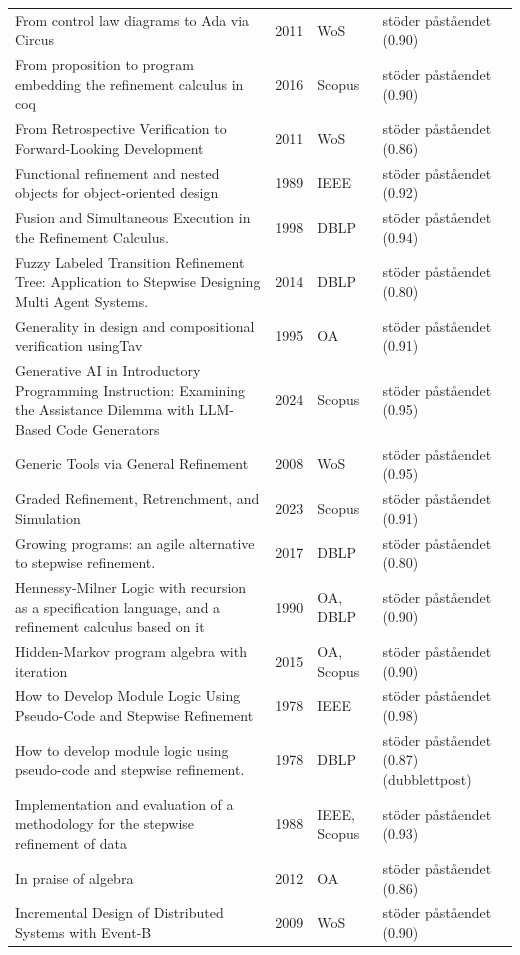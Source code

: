 \begin{longtable}{@{}%
  >{\raggedright\arraybackslash}p{}c%
  >{\raggedright\arraybackslash}p{}%
  >{\raggedright\arraybackslash}p{}@{}}
From control law diagrams to Ada via Circus & 2011 & WoS & stöder påståendet (0.90) \\
From proposition to program embedding the refinement calculus in coq & 2016 & Scopus & stöder påståendet (0.90) \\
From Retrospective Verification to Forward-Looking Development & 2011 & WoS & stöder påståendet (0.86) \\
Functional refinement and nested objects for object-oriented design & 1989 & IEEE & stöder påståendet (0.92) \\
Fusion and Simultaneous Execution in the Refinement Calculus. & 1998 & DBLP & stöder påståendet (0.94) \\
Fuzzy Labeled Transition Refinement Tree: Application to Stepwise Designing Multi Agent Systems. & 2014 & DBLP & stöder påståendet (0.80) \\
Generality in design and compositional verification usingTav & 1995 & OA & stöder påståendet (0.91) \\
Generative AI in Introductory Programming Instruction: Examining the Assistance Dilemma with LLM-Based Code Generators & 2024 & Scopus & stöder påståendet (0.95) \\
Generic Tools via General Refinement & 2008 & WoS & stöder påståendet (0.95) \\
Graded Refinement, Retrenchment, and Simulation & 2023 & Scopus & stöder påståendet (0.91) \\
Growing programs: an agile alternative to stepwise refinement. & 2017 & DBLP & stöder påståendet (0.80) \\
Hennessy-Milner Logic with recursion as a specification language, and a refinement calculus based on it & 1990 & OA, DBLP & stöder påståendet (0.90) \\
Hidden-Markov program algebra with iteration & 2015 & OA, Scopus & stöder påståendet (0.90) \\
How to Develop Module Logic Using Pseudo-Code and Stepwise Refinement & 1978 & IEEE & stöder påståendet (0.98) \\
How to develop module logic using pseudo-code and stepwise refinement. & 1978 & DBLP & stöder påståendet (0.87) (dubblettpost) \\
Implementation and evaluation of a methodology for the stepwise refinement of data & 1988 & IEEE, Scopus & stöder påståendet (0.93) \\
In praise of algebra & 2012 & OA & stöder påståendet (0.86) \\
Incremental Design of Distributed Systems with Event-B & 2009 & WoS & stöder påståendet (0.90) \\

\end{longtable}
